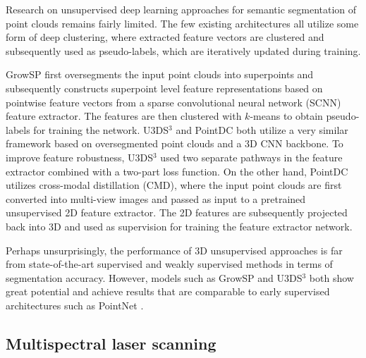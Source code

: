 Research on unsupervised deep learning approaches for semantic segmentation of point clouds remains fairly limited. The few existing architectures all utilize some form of deep clustering, where extracted feature vectors are clustered and subsequently used as pseudo-labels, which are iteratively updated during training.

GrowSP \citep{zhang2023growsp} first oversegments the input point clouds into superpoints and subsequently constructs superpoint level feature representations based on pointwise feature vectors from a sparse convolutional neural network (SCNN) feature extractor. The features are then clustered with $k$-means to obtain pseudo-labels for training the network. U3DS$^{3}$ \citep{liu2024u3ds} and PointDC \citep{chen2023pointdc} both utilize a very similar framework based on oversegmented point clouds and a 3D CNN backbone. To improve feature robustness, U3DS$^{3}$ used two separate pathways in the feature extractor combined with a two-part loss function. On the other hand, PointDC utilizes cross-modal distillation (CMD), where the input point clouds are first converted into multi-view images and passed as input to a pretrained unsupervised 2D feature extractor. The 2D features are subsequently projected back into 3D and used as supervision for training the feature extractor network.

Perhaps unsurprisingly, the performance of 3D unsupervised approaches is far from state-of-the-art supervised and weakly supervised methods in terms of segmentation accuracy. However, models such as GrowSP and U3DS$^{3}$ both show great potential and achieve results that are comparable to early supervised architectures such as PointNet \citep{zhang2023growsp,liu2024u3ds}.

\subsection{Multispectral laser scanning}

